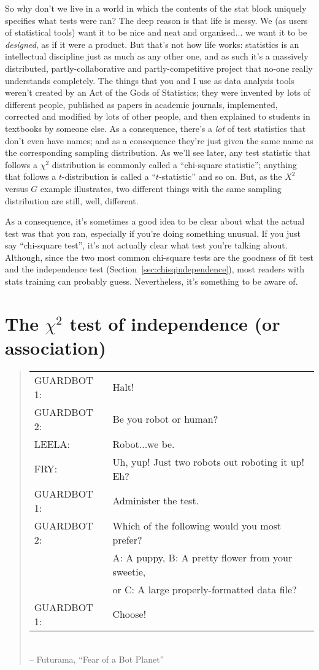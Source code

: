 So why don't we live in a world in which the contents of the stat block uniquely specifies what tests were ran? The deep reason is that life is messy. We (as users of statistical tools) want it to be nice and neat and organised... we want it to be {\it designed}, as if it were a product. But that's not how life works: statistics is an intellectual discipline just as much as any other one, and as such it's a massively distributed, partly-collaborative and partly-competitive project that no-one really understands completely. The things that you and I use as data analysis tools weren't created by an Act of the Gods of Statistics; they were invented by lots of different people, published as papers in academic journals, implemented, corrected and modified by lots of other people, and then explained to students in textbooks by someone else. As a consequence, there's a {\it lot} of test statistics that don't even have names; and as a consequence they're just given the same name as the corresponding sampling distribution. As we'll see later, any test statistic that follows a $\chi^2$ distribution is commonly called a ``chi-square statistic''; anything that follows a $t$-distribution is called a ``$t$-statistic'' and so on. But, as the $X^2$ versus $G$ example illustrates, two different things with the same sampling distribution are still, well, different. 

As a consequence, it's sometimes a good idea to be clear about what the actual test was that you ran, especially if you're doing something unusual. If you just say ``chi-square test'', it's not actually clear what test you're talking about. Although, since the two most common chi-square tests are the goodness of fit test and the independence test (Section~\ref{sec:chisqindependence}), most readers with stats training can probably guess. Nevertheless, it's something to be aware of.


\section{The $\chi^2$ test of independence (or association)\label{sec:chisqindependence}}

\begin{quote}
{\it
\begin{tabular}{ll}
GUARDBOT 1:& Halt! \\
GUARDBOT 2:& Be you robot or human? \\
LEELA:& Robot...we be. \\
FRY:& Uh, yup! Just two robots out roboting it up!  Eh? \\
GUARDBOT 1:& Administer the test. \\
GUARDBOT 2:& Which of the following would you most prefer? \\
& A: A puppy, B: A pretty flower from your sweetie, \\
& or C: A large properly-formatted data file? \\
GUARDBOT 1:& Choose! \\
\end{tabular}
} \\
\hspace*{2cm} -- Futurama, ``Fear of a Bot Planet''
\end{quote}

